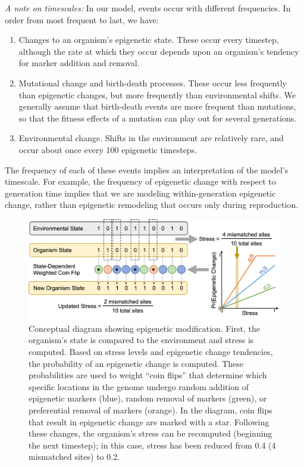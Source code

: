 \documentclass{article}
\begin{document}
\textit{A note on timescales:} In our model, events occur with different frequencies. In order from most frequent to last, we have:
\begin{enumerate}
    \item Changes to an organism's epigenetic state. These occur every timestep, although the rate at which they occur depends upon an organism's tendency for marker addition and removal.

    \item Mutational change and birth-death processes. These occur less frequently than epigenetic changes, but more frequently than environmental shifts. We generally assume that birth-death events are more frequent than mutations, so that the fitness effects of a mutation can play out for several generations.

    \item Environmental change. Shifts in the environment are relatively rare, and occur about once every 100 epigenetic timesteps. 
\end{enumerate}

The frequency of each of these events implies an interpretation of the model's timescale. For example, the frequency of epigenetic change with respect to generation time implies that we are modeling within-generation epigenetic change, rather than epigenetic remodeling that occurs only during reproduction.


\begin{figure}
    \centering
    \includegraphics[width=\textwidth]{Figures/ModelDiag_v1.png}
    \caption{Conceptual diagram showing epigenetic modification. First, the organism's state is compared to the environment and stress is computed. Based on stress levels and epigenetic change tendencies, the probability of an epigenetic change is computed. These probabilities are used to weight ``coin flips'' that determine which specific locations in the genome undergo random addition of epigenetic markers (blue), random removal of markers (green), or preferential removal of markers (orange). In the diagram, coin flips that result in epigenetic change are marked with a star. Following these changes, the organism's stress can be recomputed (beginning the next timestep); in this case, stress has been reduced from 0.4 (4 mismatched sites) to 0.2.}
    \label{fig:modeldiag}
\end{figure}
\end{document}
